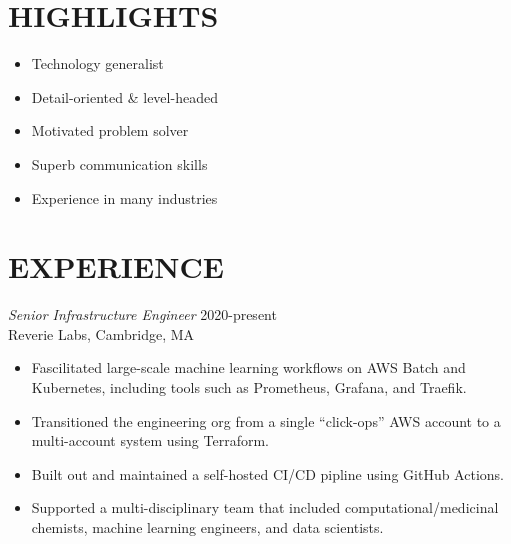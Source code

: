 \documentclass[line,margin]{res}
\begin{document}
\address{\,\,\,\,\,\,\,\,\,\,\,\,\,\,\,\,\,\,\,\,\, dana.merrick@gmail.com}
\address{\,\,\,\,\,\,\,\,\,\,\,\,\,\,\,\,\,\,\,\,USA-based -- 978.206.1331}

\begin{resume}

\section{HIGHLIGHTS}
  \begin{itemize}  \itemsep -2pt %
    \item Technology generalist
    \item Detail-oriented \& level-headed
    \item Motivated problem solver
    \item Superb communication skills
    \item Experience in many industries
  \end{itemize}
  
\section{EXPERIENCE}
  {\sl Senior Infrastructure Engineer}  \hfill 2020-present \\
  Reverie Labs,
  Cambridge, MA
  \begin{itemize}  \itemsep -2pt %
    \item Fascilitated large-scale machine learning workflows on AWS Batch and Kubernetes, including tools such as Prometheus, Grafana, and Traefik.
    \item Transitioned the engineering org from a single ``click-ops'' AWS account to a multi-account system using Terraform.
    \item Built out and maintained a self-hosted CI/CD pipline using GitHub Actions.
    \item Supported a multi-disciplinary team that included computational/medicinal chemists, machine learning engineers, and data scientists.
  \end{itemize}


\end{resume}
\end{document}
